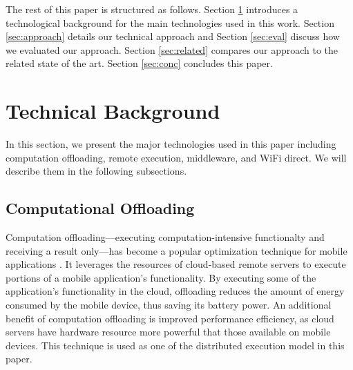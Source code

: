 \documentclass{sig-alternate}[10pt]
\begin{document}

The rest of this paper is structured as follows. Section \ref{sec:background} introduces a technological background for the main technologies used in this work. Section \ref{sec:approach} details our technical approach and Section \ref{sec:eval} discuss how we evaluated our approach. Section \ref{sec:related} compares our approach to the related state of the art. Section \ref{sec:conc} concludes this paper.
 
\section{Technical Background}
\label{sec:background}
In this section, we present the major technologies used in this paper including computation offloading, remote execution, middleware, and WiFi direct. We will describe them in the following subsections.

\subsection{Computational Offloading}   
Computation offloading---executing computation-intensive functionalty and receiving a result only---has become a popular optimization technique for mobile applications \cite{maui,chun+:eurosys11,kwon+:icsm13,wen2012energy}. It leverages the resources of cloud-based remote servers to execute portions of a mobile application's functionality. By executing some of the application's functionality in the cloud, offloading reduces the amount of energy consumed by the mobile device, thus saving its battery power. An additional benefit of computation offloading is improved performance efficiency, as cloud servers have hardware resource more powerful that those available on mobile devices. This technique is used as one of the distributed execution model in this paper.
\end{document}
